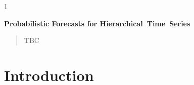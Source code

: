 \documentclass[12pt]{article}
\newcommand{\blind}{1}
\theoremstyle{definition}
\begin{document}
	\blind
	{
		\bigskip
		\bigskip
		\bigskip
		\begin{center}
			{\LARGE\bf Probabilistic Forecasts for Hierarchical~Time~Series}
		\end{center}
		\medskip
	} \fi
	
	\bigskip


\begin{abstract}
	TBC
\end{abstract}


\newpage
{} %

\section{Introduction}\label{sec:intro}
\end{document}
